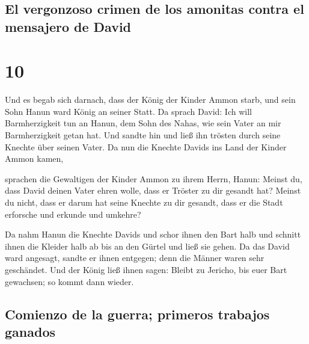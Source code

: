\hypertarget{el-vergonzoso-crimen-de-los-amonitas-contra-el-mensajero-de-david}{%
\subsection{El vergonzoso crimen de los amonitas contra el mensajero de
David}\label{el-vergonzoso-crimen-de-los-amonitas-contra-el-mensajero-de-david}}

\hypertarget{section-9}{%
\section{10}\label{section-9}}

 Und es begab sich darnach, dass der König der Kinder
Ammon starb, und sein Sohn Hanun ward König an seiner Statt.
 Da sprach David: Ich will Barmherzigkeit tun an Hanun,
dem Sohn des Nahas, wie sein Vater an mir Barmherzigkeit getan hat. Und
sandte hin und ließ ihn trösten durch seine Knechte über seinen Vater.
Da nun die Knechte Davids ins Land der Kinder Ammon kamen,

 sprachen die Gewaltigen der Kinder Ammon zu ihrem Herrn,
Hanun: Meinst du, dass David deinen Vater ehren wolle, dass er Tröster
zu dir gesandt hat? Meinst du nicht, dass er darum hat seine Knechte zu
dir gesandt, dass er die Stadt erforsche und erkunde und umkehre?

 Da nahm Hanun die Knechte Davids und schor ihnen den Bart
halb und schnitt ihnen die Kleider halb ab bis an den Gürtel und ließ
sie gehen.  Da das David ward angesagt, sandte er ihnen
entgegen; denn die Männer waren sehr geschändet. Und der König ließ
ihnen sagen: Bleibt zu Jericho, bis euer Bart gewachsen; so kommt dann
wieder.

\hypertarget{comienzo-de-la-guerra-primeros-trabajos-ganados}{%
\subsection{Comienzo de la guerra; primeros trabajos
ganados}\label{comienzo-de-la-guerra-primeros-trabajos-ganados}}

